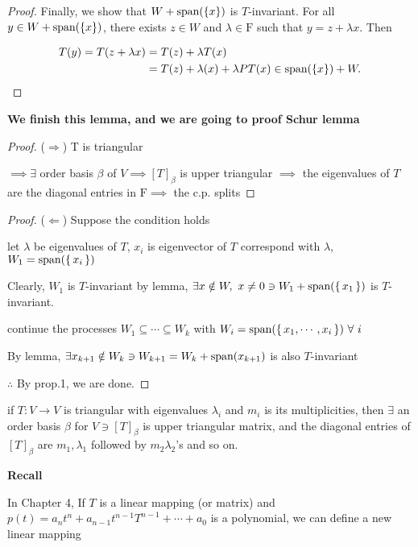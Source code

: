 \begin{proof}
	Finally, we show that $W +  \text{span($\{x\}$)}$ is $T$-invariant. For all $y \in W + \text{span($\{x\}$)}$, there exists $z \in W$ and $\lambda \in \mathrm F$ such that $y = z + \lambda x$. Then 	
	
	\begin{align*}
		T(y) = T(z+\lambda x) 
		& = T(z) + \lambda T(x) \\
		& = T(z) + \lambda(x)+\lambda PT(x)\in \text{span($\{x\}$)}+W.
	\end{align*} 
\end{proof}

\textbf{We finish this lemma, and we are going to proof Schur lemma}

\begin{proof}($\Rightarrow$) T is triangular

$\implies \exists$ order basis $\beta$ of $V \implies [T]_{\beta}$ is upper triangular $\implies$ the eigenvalues of $T$ are the diagonal entries in $\mathrm F \implies$ the c.p. splits  
	
\end{proof}

\begin{proof}($\Leftarrow$) Suppose the condition holds

let $\lambda$ be eigenvalues of $T$, $x_i$ is eigenvector of $T$ correspond with $\lambda$, $W_1 = \text{span($\left\{ \,x_i \,\right\}$)}$

Clearly, $W_1$ is $T$-invariant by lemma, $\exists x \notin W,~ x \neq 0 \ni W_1 + \text{span($\left\{ \,x_1 \,\right\}$)}$ is $T$-invariant.

continue the processes $W_1 \subseteq \cdots \subseteq W_k$ with $W_i = \text{span($\left\{ \,x_1,\cdots,x_i \,\right\}$)} ~\forall~ i$

By lemma, $\exists x_{k+1} \notin W_k \ni W_{k+1} = W_k + \text{span($x_{k+1}$)}$ is also $T$-invariant

$\therefore$ By prop.1, we are done. 
	
\end{proof}

\begin{cor*}
	if $T:V\rightarrow V$ is triangular with eigenvalues $\lambda_i$ and $m_i$ is its multiplicities, then $\exists$ an order basis $\beta$ for $V \ni [T]_{\beta}$ is upper triangular matrix, and the diagonal entries of $[T]_{\beta}$ are $m_1,\lambda_1$ followed by $m_2 \lambda_2$'s and so on.
\end{cor*}

\textbf{Recall}

In Chapter 4, If $T$ is a linear mapping (or matrix) and $p(t) = a_nt^n + a_{n-1}t^{n-1}T^{n-1} + \cdots + a_0$ is a polynomial, we can define a new linear mapping

